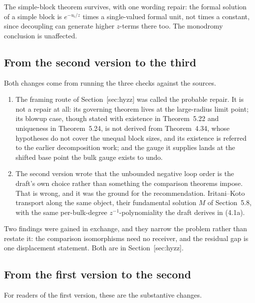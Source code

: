 \documentclass[11pt]{article}
\theoremstyle{definition}
\theoremstyle{remark}
\begin{document}
The simple-block theorem survives, with one wording repair: the formal solution
of a simple block is $e^{-u_i/z}$ times a single-valued formal unit, not times a
constant, since decoupling can generate higher $z$-terms there too. The
monodromy conclusion is unaffected.

\subsection*{From the second version to the third}

Both changes come from running the three checks against the sources.

\begin{enumerate}
\item The framing route of Section~\textup{[sec:hyzz]} was called the probable
  repair. It is not a repair at all: its governing theorem lives at the
  large-radius limit point; its blowup case, though stated with existence in
  Theorem~5.22 and uniqueness in Theorem~5.24, is not derived from
  Theorem~4.34, whose hypotheses do not cover the unequal block sizes, and its
  existence is referred to the earlier decomposition work; and the gauge it
  supplies lands at the shifted base point the bulk gauge exists to undo.
\item The second version wrote that the unbounded negative loop order is the
  draft's own choice rather than something the comparison theorems impose. That
  is wrong, and it was the ground for the recommendation. Iritani--Koto
  transport along the same object, their fundamental solution $M$ of
  Section~5.8, with the same per-bulk-degree $z^{-1}$-polynomiality the draft
  derives in (4.1a).
\end{enumerate}

Two findings were gained in exchange, and they narrow the problem rather than
restate it: the comparison isomorphisms need no receiver, and the residual gap
is one displacement statement. Both are in Section~\textup{[sec:hyzz]}.

\subsection*{From the first version to the second}

For readers of the first version, these are the substantive changes.
\end{document}
